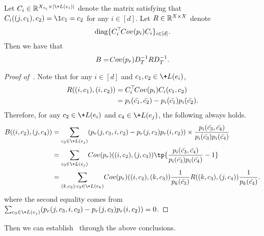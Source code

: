 \documentclass[a4paper,11pt]{article}
\begin{document}
\begin{proposition}\label{prop:convert_B_to_Cov}
    Let $C_i\in \mathbb{R}^{X_{v_i}\times |\+L(e_i)|}$ denote the matrix satisfying that $C_i((j,c_1),c_2) = \1{c_1 = c_2}$ for any $i\in [d]$.
    Let $\*R \in \mathbb{R}^{X\times X}$ denote $$
    \operatorname{diag}\{C^\top_i \!{Cov}(\*p_i)C_i\}_{i\in [d]}.
    $$
    Then we have that
    $$
        \*B =  \!{Cov}(\*p_r)D_T^{-1}\*RD_T^{-1}.
    $$
\end{proposition}
\begin{proof}[Proof of~]
Note that for any $i\in [d]$ and $c_1,c_2\in \+L(e_i)$,
    \begin{align*}
        \*R((i,c_1),(i,c_2)) &= C_i^\top  \!{Cov}(\*p_i)C_i(c_1,c_2)
        \\&= \*p_i(\bar{c_1},\bar{c_2})-\*p_i(\bar{c_1})\*p_i(\bar{c_2}).
    \end{align*}
    Therefore, for any $c_2\in \+L(e_i)$ and $c_4\in \+L(e_j)$, the following always holds.
    \begin{align*}
        \*B((i,c_2),(j,c_4)) &= 
        \sum_{c_3 \in \+L(e_j)}
        (\*p_r(j,c_3,i,c_2) - \*p_r(j,c_3)\*p_r(i,c_2))
        \times \frac{\*p_i(\bar{c_3},\bar{c_4})}{\*p_i(\bar{c_3})\*p_i(\bar{c_4})}
        \\&= \sum_{c_3\in \+L(e_j)}  \!{Cov}(\*p_r)((i,c_2),(j,c_3)) \tp{\frac{\*p_i(\bar{c_3},\bar{c_4})}{\*p_i(\bar{c_3})\*p_i(\bar{c_4})} - 1}
        \\&= \sum_{(k,c_3): c_3\in \+L(e_k)}  \!{Cov}(\*p_r)((i,c_2),(k,c_3))
        \frac{1}{\*p_k(\bar{c_3})}
        \*R((k,c_3),(j,c_4))
        \frac{1}{\*p_k(\bar{c_4})} .
    \end{align*}
    where the second equality comes from $\sum_{c_3 \in \+L(e_j)}
        (\*p_r(j,c_3,i,c_2) - \*p_r(j,c_3)\*p_r(i,c_2))=0$.
\end{proof}
Then we can establish~ through the above conclusions.
\end{document}
